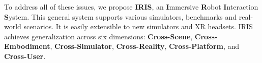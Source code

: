 To address all of these issues, we propose \textbf{IRIS},
an \textbf{I}mmersive \textbf{R}obot \textbf{I}nteraction \textbf{S}ystem.
This general system supports various simulators, benchmarks and real-world scenarios.
It is easily extensible to new simulators and XR headsets.
IRIS achieves generalization across six dimensions:
\textbf{Cross-Scene}, \textbf{Cross-Embodiment}, \textbf{Cross-Simulator}, \textbf{Cross-Reality}, \textbf{Cross-Platform}, and \textbf{Cross-User}.


